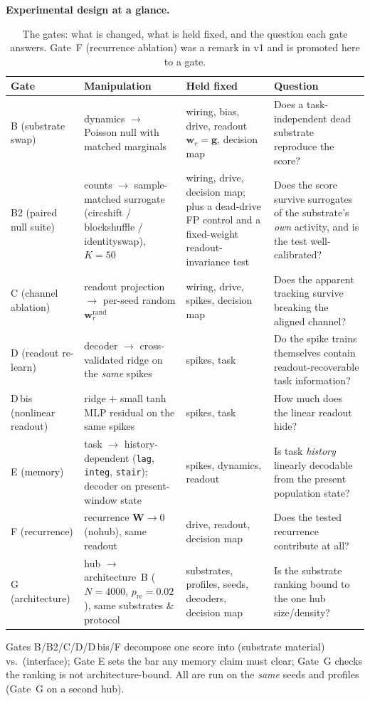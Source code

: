 \documentclass[10pt,a4paper]{article}
\begin{document}
\noindent
\textbf{Experimental design at a glance.}
\begin{table}[H]
\centering
\caption{The gates: what is changed, what is held fixed, and the
question each gate answers. Gate~F (recurrence ablation) was a remark in
v1 and is promoted here to a gate.}
\label{tab:design}
\small
\begin{tabular}{@{}p{5.0em}p{11em}p{11em}p{16.5em}@{}}
\toprule
\textbf{Gate} & \textbf{Manipulation} & \textbf{Held fixed} &
\textbf{Question} \\
\midrule
B (substrate
swap) & dynamics $\to$ Poisson
null with matched marginals
& wiring, bias, drive,
readout $\mathbf{w}_r=\mathbf{g}$, decision map
& Does a task-independent
dead substrate reproduce
the score? \\
B2 (paired
null suite) & counts $\to$ sample-matched
surrogate (circshift / blockshuffle /
identityswap), $K=50$
& wiring, drive, decision map;
plus a dead-drive FP control and a
fixed-weight readout-invariance test
& Does the score survive
surrogates of the substrate's
\emph{own} activity, and is the
test well-calibrated? \\
C (channel
ablation) & readout projection
$\to$ per-seed random $\mathbf{w}_r^{\mathrm{rand}}$
& wiring, drive, spikes,
decision map
& Does the apparent tracking
survive breaking the aligned
channel? \\
D (readout
re-learn) & decoder $\to$ cross-validated ridge on
the \emph{same} spikes
& spikes, task
& Do the spike trains themselves
contain readout-recoverable task
information? \\
D\,bis (nonlinear
readout) & ridge $+$ small tanh MLP residual
on the same spikes
& spikes, task
& How much does the linear
readout hide? \\
E (memory) & task $\to$ history-dependent
(\texttt{lag}, \texttt{integ},
\texttt{stair}); decoder on
present-window state
& spikes, dynamics, readout
& Is task \emph{history} linearly
decodable from the present
population state? \\
F (recurrence) & recurrence $\mathbf{W}\to0$
(nohub), same readout
& drive, readout, decision map
& Does the tested recurrence
contribute at all? \\
G (architecture) & hub $\to$ architecture~B
($N=4000$, $p_{\mathrm{re}}=0.02$),
same substrates \& protocol
& substrates, profiles, seeds,
decoders, decision map
& Is the substrate ranking bound
to the one hub size/density? \\
\bottomrule
\end{tabular}
\end{table}
Gates B/B2/C/D/D\,bis/F decompose one score into (substrate material)
vs.\ (interface); Gate E sets the bar any memory claim must clear; Gate~G
checks the ranking is not architecture-bound. All
are run on the \emph{same} seeds and profiles (Gate~G on a second hub).
\end{document}
